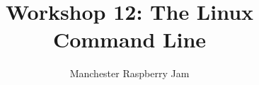 \documentclass[a4paper, twocolumn, twoside, 11pt]{article}
\begin{document}
	\author{Manchester Raspberry Jam}
	\title{Workshop 12: The Linux Command Line}
	\date{}
	\maketitle
	
	\setcounter{tocdepth}{1}
	\tableofcontents
	
	
	
	
	
	
	
	\newpage
	
	
\end{document}
